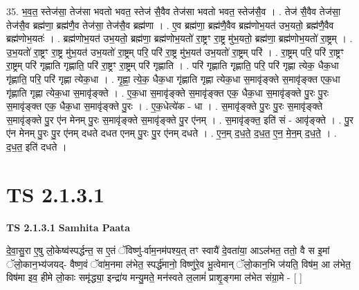 \documentclass[17pt]{extarticle}
\begin{document}
35. भ॒व॒त॒ स्तेज॑सा॒ तेज॑सा भवतो भवत॒ स्तेज॑ सै॒वैव तेज॑सा भवतो भवत॒ स्तेज॑सै॒व । . तेज॑ सै॒वैव तेज॑सा॒ तेज॑सै॒व ब्रह्म॑णा॒ ब्रह्म॑णै॒व तेज॑सा॒ तेज॑सै॒व ब्रह्म॑णा । . ए॒व ब्रह्म॑णा॒ ब्रह्म॑णै॒वैव ब्रह्म॑णोभ॒यत॑ उभ॒यतो॒ ब्रह्म॑णै॒वैव ब्रह्म॑णोभ॒यतः॑ । . ब्रह्म॑णोभ॒यत॑ उभ॒यतो॒ ब्रह्म॑णा॒ ब्रह्म॑णोभ॒यतो॑ रा॒ष्ट्रꣳ रा॒ष्ट्र मु॑भ॒यतो॒ ब्रह्म॑णा॒ ब्रह्म॑णोभ॒यतो॑ रा॒ष्ट्रम् । . उ॒भ॒यतो॑ रा॒ष्ट्रꣳ रा॒ष्ट्र मु॑भ॒यत॑ उभ॒यतो॑ रा॒ष्ट्रम् परि॒ परि॑ रा॒ष्ट्र मु॑भ॒यत॑ उभ॒यतो॑ रा॒ष्ट्रम् परि॑ । . रा॒ष्ट्रम् परि॒ परि॑ रा॒ष्ट्रꣳ रा॒ष्ट्रम् परि॑ गृह्णाति गृह्णाति॒ परि॑ रा॒ष्ट्रꣳ रा॒ष्ट्रम् परि॑ गृह्णाति । . परि॑ गृह्णाति गृह्णाति॒ परि॒ परि॑ गृह्णा त्येक॒ धैक॒धा गृ॑ह्णाति॒ परि॒ परि॑ गृह्णा त्येक॒धा । . गृ॒ह्णा॒ त्ये॒क॒ धैक॒धा गृ॑ह्णाति गृह्णा त्येक॒धा स॒मावृ॑ङ्क्ते स॒मावृ॑ङ्क्त एक॒धा गृ॑ह्णाति गृह्णा त्येक॒धा स॒मावृ॑ङ्क्ते । . ए॒क॒धा स॒मावृ॑ङ्क्ते स॒मावृ॑ङ्क्त एक॒ धैक॒धा स॒मावृ॑ङ्क्ते पु॒रः पु॒रः स॒मावृ॑ङ्क्त एक॒ धैक॒धा स॒मावृ॑ङ्क्ते पु॒रः । . ए॒क॒धेत्ये॑क - धा । . स॒मावृ॑ङ्क्ते पु॒रः पु॒रः स॒मावृ॑ङ्क्ते स॒मावृ॑ङ्क्ते पु॒र ए॑न मेनम् पु॒रः स॒मावृ॑ङ्क्ते 
स॒मावृ॑ङ्क्ते पु॒र ए॑नम् । . स॒मावृ॑ङ्क्त॒ इति॑ सं - आवृ॑ङ्क्ते । . पु॒र ए॑न मेनम् पु॒रः पु॒र ए॑नम् दधते दधत एनम् पु॒रः पु॒र ए॑नम् दधते । . ए॒न॒म् द॒ध॒ते॒ द॒ध॒त॒ ए॒न॒ मे॒न॒म् द॒ध॒ते॒ । . द॒ध॒त॒ इति॑ दधते । \newline
\pagebreak
{}

\section{ TS 2.1.3.1 }

\textbf{TS 2.1.3.1 } \newline
\textbf{Samhita Paata} \newline

दे॒वा॒सु॒रा ए॒षु लो॒केष्व॑स्पर्द्धन्त॒ स ए॒तं ॅविष्णु॑-र्वाम॒नम॑पश्य॒त् तꣳ स्वायै॑ दे॒वता॑या॒ आऽल॑भत॒ ततो॒ वै स इ॒मां ॅलो॒कान॒भ्य॑जयद्- वैष्ण॒वं ॅवा॑म॒नमा ल॑भेत॒ स्पर्द्ध॑मानो॒ विष्णु॑रे॒व भू॒त्वेमान् ॅलो॒कान॒भि ज॑यति॒ विष॑म॒ आ ल॑भेत॒ विष॑मा इव॒ हीमे लो॒काः समृ॑द्ध्या॒ इन्द्रा॑य मन्यु॒मते॒ मन॑स्वते ल॒लामं॑ प्राशृ॒ङ्गमा ल॑भेत संग्रा॒मे - [  ] \newline
\end{document}
